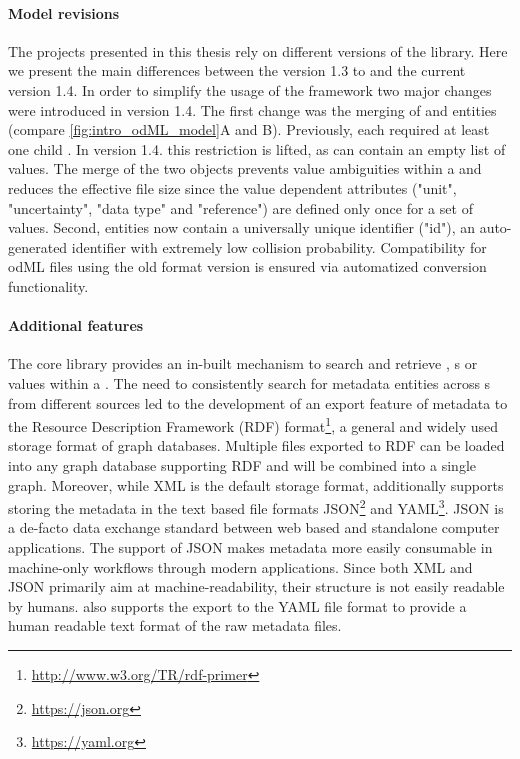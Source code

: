 \paragraph{Model revisions}
\label{sec:odml_model_revision}
The projects presented in this thesis rely on different versions of the  library. Here we present the main differences between the  version 1.3 to and the current  version 1.4.
In order to simplify the usage of the  framework two major changes were introduced in  version 1.4. The first change was the merging of  and  entities (compare \cref{fig:intro_odML_model}A and B). Previously, each  required at least one child . In version 1.4. this restriction is lifted, as  can contain an empty list of values. The merge of the two objects prevents value ambiguities within a  and reduces the effective file size since the value dependent attributes ("unit", "uncertainty", "data type" and "reference") are defined only once for a set of values. Second,  entities now contain a universally unique identifier ("id"), an auto-generated identifier with extremely low collision probability. Compatibility for odML files using the old format version is ensured via automatized conversion functionality.

\paragraph{Additional features}
The  core library provides an in-built mechanism to search and retrieve , s or values within a . The need to consistently search for metadata entities across s from different sources led to the development of an export feature of  metadata to the Resource Description Framework (RDF) format\footnote{\url{http://www.w3.org/TR/rdf-primer}}, a general and widely used storage format of graph databases. Multiple  files exported to RDF can be loaded into any graph database supporting RDF and will be combined into a single graph. Moreover, while XML is the default storage format,  additionally supports storing the metadata in the text based file formats JSON\footnote{\url{https://json.org}} and YAML\footnote{\url{https://yaml.org}}. JSON is a de-facto data exchange standard between web based and standalone computer applications. The support of JSON makes  metadata more easily consumable in machine-only workflows through modern applications. Since both XML and JSON primarily aim at machine-readability, their structure is not easily readable by humans.  also supports the export to the YAML file format to provide a human readable text format of the raw metadata files.

